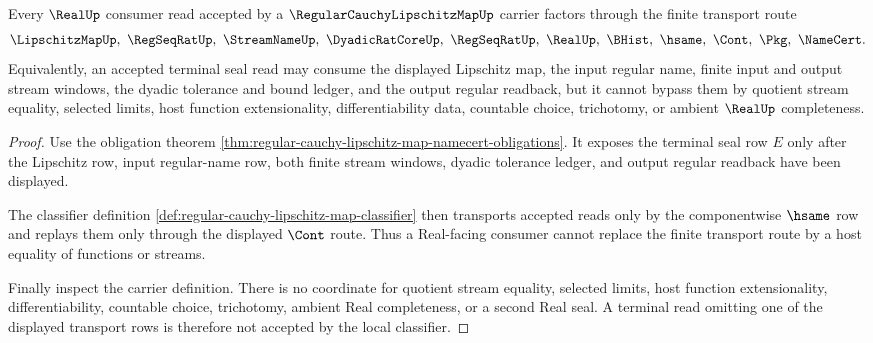 \begin{theorem}
\label{thm:regular-cauchy-lipschitz-map-real-handoff}
Every $\RealUp$ consumer read accepted by a $\RegularCauchyLipschitzMapUp$ carrier factors through the finite transport route
$$
\LipschitzMapUp,\ \RegSeqRatUp,\ \StreamNameUp,\ \DyadicRatCoreUp,\ \RegSeqRatUp,\ \RealUp,\ \BHist,\ \hsame,\ \Cont,\ \Pkg,\ \NameCert .
$$
Equivalently, an accepted terminal seal read may consume the displayed Lipschitz map, the input regular name, finite input and output stream windows, the dyadic tolerance and bound ledger, and the output regular readback, but it cannot bypass them by quotient stream equality, selected limits, host function extensionality, differentiability data, countable choice, trichotomy, or ambient $\RealUp$ completeness.
\end{theorem}
\begin{proof}
Use the obligation theorem \autoref{thm:regular-cauchy-lipschitz-map-namecert-obligations}. It exposes the terminal seal row $E$ only after the Lipschitz row, input regular-name row, both finite stream windows, dyadic tolerance ledger, and output regular readback have been displayed.

The classifier definition \autoref{def:regular-cauchy-lipschitz-map-classifier} then transports accepted reads only by the componentwise $\hsame$ row and replays them only through the displayed $\Cont$ route. Thus a Real-facing consumer cannot replace the finite transport route by a host equality of functions or streams.

Finally inspect the carrier definition. There is no coordinate for quotient stream equality, selected limits, host function extensionality, differentiability, countable choice, trichotomy, ambient Real completeness, or a second Real seal. A terminal read omitting one of the displayed transport rows is therefore not accepted by the local classifier.
\end{proof}

